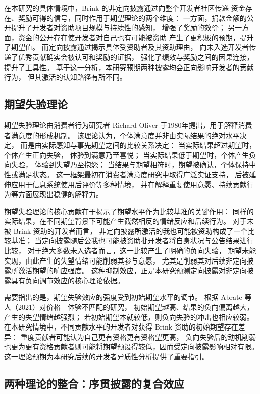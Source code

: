 \documentclass[
    type = master, %
    degree = professional,        %
    decl-page,  %
    twoside,                %
    fontset = fandol %
  ]{njuthesis}
\begin{document}
在本研究的具体情境中，Brink 的非定向披露通过向整个开发者社区传递
资金存在、奖励可得的信号，同时作用于期望理论的两个维度：
一方面，捐款金额的公开提升了开发者对资助项目规模与持续性的感知，
增强了奖励的效价；
另一方面，资金的公开存在使开发者对自己也有可能被资助
产生了更积极的预期，提升了期望值。
而定向披露通过揭示具体受资助者及其资助理由，
向未入选开发者传递了优秀贡献确实会被认可和奖励的证据，
强化了绩效与奖励之间的因果连接，提升了工具性。
基于这一分析，本研究预期两种披露均会正向影响开发者的贡献行为，
但其激活的认知路径有所不同。

\subsection{期望失验理论}

期望失验理论由消费者行为研究者
Richard Oliver 于1980年提出，用于解释消费者满意度的形成机制\cite{oliver1980cognitive}。
该理论认为，个体满意度并非由实际结果的绝对水平决定，
而是由实际感知与事先期望之间的比较关系决定：
当实际结果超过期望时，个体产生正向失验，
体验到满意乃至喜悦；
当实际结果低于期望时，个体产生负向失验，
体验到失望乃至抱怨；
当结果与期望相符时，期望被确认，个体保持中性或满足状态。
这一框架最初在消费者满意度研究中取得广泛实证支持，
后被延伸应用于信息系统使用后评价等多种情境，
并在解释重复使用意愿、持续贡献行为等方面展现出稳健的解释力。

期望失验理论的核心贡献在于揭示了期望水平作为比较基准的关键作用：
同样的实际结果，在不同期望背景下可能产生截然相反的情绪反应和后续行为。
对于未被 Brink 资助的开发者而言，
非定向披露所激活的我也可能被资助构成了一个比较基准；
当定向披露随后公我也可能被资助批开发者将自身状况与公告结果进行比较，
对于绝大多数未入选者而言，这一比较产生了明确的负向失验，
期望未能实现，由此产生的失望情绪可能削弱其参与意愿，
尤其是削弱其对后续非定向披露所激活期望的响应强度。
这种抑制效应，正是本研究预测定向披露对非定向披露具有负向调节效应的核心理论依据。

需要指出的是，期望失验效应的强度受到初始期望水平的调节。
根据 Abrate 等人（2021）对价格—体验不匹配的研究，
初始期望越高、结果的负向偏离越大，产生的失望情绪越强烈；
若初始期望本就较低，则负向失验的冲击也相应较弱。
在本研究情境中，不同贡献水平的开发者对获得 Brink 资助的初始期望存在差异：
重度贡献者可能认为自己更有资格更有资格望更高，
负向失验后的动机削弱也更为更有资格贡献者则可能将期望预设得较低，因而受定向披露影响相对有限。
这一理论预期为本研究后续的开发者异质性分析提供了重要指引。

\subsection{两种理论的整合：序贯披露的复合效应}
\end{document}

